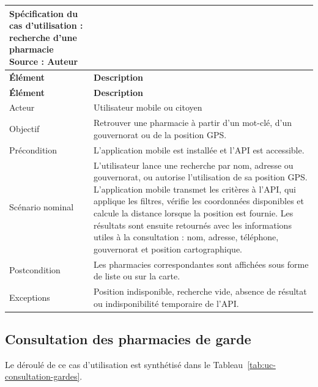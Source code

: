 \begin{longtable}{L{4cm}L{10cm}}
    \caption{Spécification du cas d'utilisation : recherche d'une pharmacie\\ \small Source : Auteur}\label{tab:uc-recherche}\\
    \toprule
    \textbf{Élément} & \textbf{Description} \\
    \midrule
    \endfirsthead
    \toprule
    \textbf{Élément} & \textbf{Description} \\
    \midrule
    \endhead
    Acteur & Utilisateur mobile ou citoyen \\
    Objectif & Retrouver une pharmacie à partir d'un mot-clé, d'un gouvernorat ou de la position GPS. \\
    Précondition & L'application mobile est installée et l'API est accessible. \\
    Scénario nominal & L'utilisateur lance une recherche par nom, adresse ou gouvernorat, ou autorise l'utilisation de sa position GPS. L'application mobile transmet les critères à l'API, qui applique les filtres, vérifie les coordonnées disponibles et calcule la distance lorsque la position est fournie. Les résultats sont ensuite retournés avec les informations utiles à la consultation : nom, adresse, téléphone, gouvernorat et position cartographique. \\
    Postcondition & Les pharmacies correspondantes sont affichées sous forme de liste ou sur la carte. \\
    Exceptions & Position indisponible, recherche vide, absence de résultat ou indisponibilité temporaire de l'API. \\
    \bottomrule
\end{longtable}

\subsection{Consultation des pharmacies de garde}

Le déroulé de ce cas d'utilisation est synthétisé dans le Tableau~\ref{tab:uc-consultation-gardes}.

